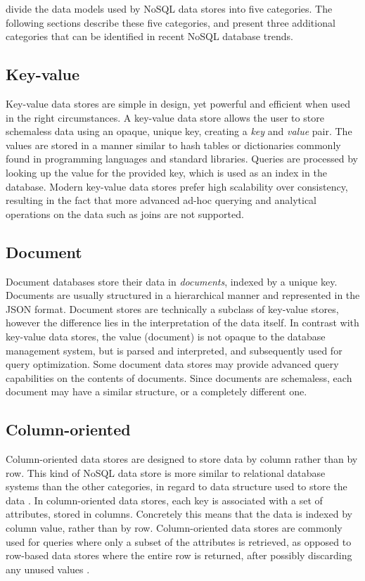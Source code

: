 \textcite{Nayak2013} divide the data models used by NoSQL data stores into five categories.
The following sections describe these five categories, and present three additional categories that can be identified in recent NoSQL database trends.

\subsection{Key-value}
\label{subsec:key-value}

Key-value data stores are simple in design, yet powerful and efficient when used in the right circumstances.
A key-value data store allows the user to store schemaless data using an opaque, unique key, creating a \textit{key} and \textit{value} pair.
The values are stored in a manner similar to hash tables or dictionaries commonly found in programming languages and standard libraries.
Queries are processed by looking up the value for the provided key, which is used as an index in the database.
Modern key-value data stores prefer high scalability over consistency, resulting in the fact that more advanced ad-hoc querying and analytical operations on the data such as joins are not supported.

\subsection{Document}
\label{subsec:document}

Document databases store their data in \textit{documents}, indexed by a unique key.
Documents are usually structured in a hierarchical manner and represented in the JSON format.
Document stores are technically a subclass of key-value stores, however the difference lies in the interpretation of the data itself.
In contrast with key-value data stores, the value (document) is not opaque to the database management system, but is parsed and interpreted, and subsequently used for query optimization.
Some document data stores may provide advanced query capabilities on the contents of documents.
Since documents are schemaless, each document may have a similar structure, or a completely different one.

\subsection{Column-oriented}
\label{subsec:column-oriented}

Column-oriented data stores are designed to store data by column rather than by row.
This kind of NoSQL data store is more similar to relational database systems than the other categories, in regard to data structure used to store the data \autocite{Abadi2008}.
In column-oriented data stores, each key is associated with a set of attributes, stored in columns.
Concretely this means that the data is indexed by column value, rather than by row.
Column-oriented data stores are commonly used for queries where only a subset of the attributes is retrieved, as opposed to row-based data stores where the entire row is returned, after possibly discarding any unused values \autocite{Abadi2009}.

